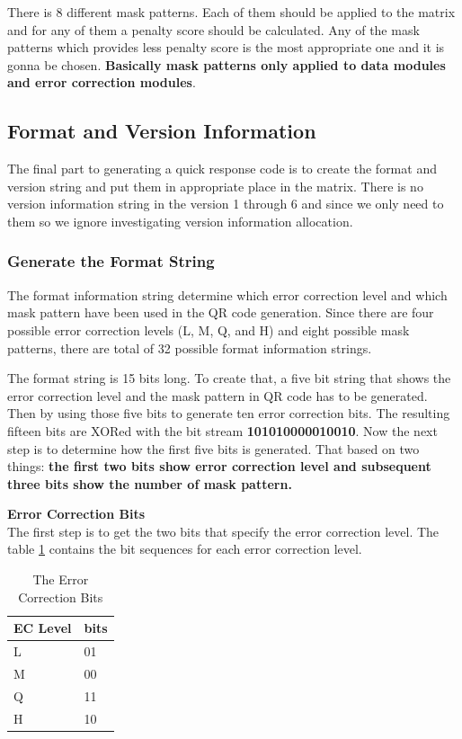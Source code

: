 There is 8 different mask patterns. Each of them should be applied to the matrix and for any of them a penalty score should be calculated\cite{1iso}. Any of the mask patterns which provides less penalty score is the most appropriate one and it is gonna be chosen. \textbf{Basically mask patterns only applied to data modules and error correction modules}.

\subsection{Format and Version Information}

The final part to generating a quick response code is to create the format and version string and put them in appropriate place in the matrix. There is no version information string in the version 1 through 6 and since we only need to them so we ignore investigating version information allocation.

\subsubsection{Generate the Format String}\label{Format}

The format information string determine which error correction level and which mask pattern have been used in the QR code generation. Since there are four possible error correction levels (L, M, Q, and H) and eight possible mask patterns, there are total of 32 possible format information strings.

The format string is 15 bits long. To create that, a five bit string that shows the error correction level and the mask pattern in QR code has to be generated. Then by using those five bits to generate ten error correction bits. The resulting fifteen bits are XORed with the bit stream \textbf{101010000010010}. 
Now the next step is to determine how the first five bits is generated. That based on two things: \textbf{the first two bits show error correction level and  subsequent three bits show the number of mask pattern.}

\textbf{Error Correction Bits}\\

The first step is to get the two bits that specify the error correction level. The table \ref{table2.3} contains the bit sequences for each error correction level. 

\begin{table}[h!]
  \centering
          \caption{The Error Correction Bits}
         \label{table2.3}
    \begin{tabular}{| l | l |}
    \hline
    EC Level & bits \\ \hline
    L & 01  \\ \hline
    M & 00  \\ \hline
    Q & 11 \\ \hline
    H & 10 \\ \hline
    \end{tabular}

\end{table}

